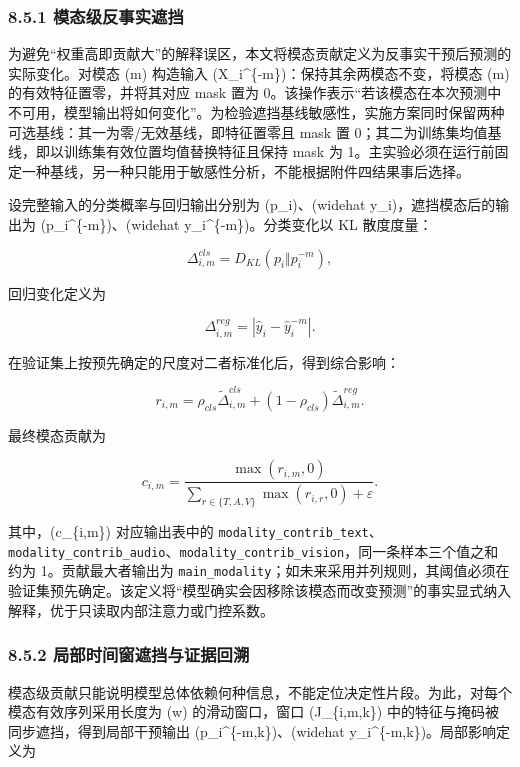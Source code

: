 \documentclass[
  12pt,
  a4paper,
]{ctexart}
\begin{document}
\hypertarget{ux6a21ux6001ux7ea7ux53cdux4e8bux5b9eux906eux6321}{%
\subsubsection{8.5.1
模态级反事实遮挡}\label{ux6a21ux6001ux7ea7ux53cdux4e8bux5b9eux906eux6321}}

为避免``权重高即贡献大''的解释误区，本文将模态贡献定义为反事实干预后预测的实际变化。对模态
(m) 构造输入 (X\_i\^{}\{-m\})：保持其余两模态不变，将模态 (m)
的有效特征置零，并将其对应 mask 置为
0。该操作表示``若该模态在本次预测中不可用，模型输出将如何变化''。为检验遮挡基线敏感性，实施方案同时保留两种可选基线：其一为零/无效基线，即特征置零且
mask 置 0；其二为训练集均值基线，即以训练集有效位置均值替换特征且保持
mask 为
1。主实验必须在运行前固定一种基线，另一种只能用于敏感性分析，不能根据附件四结果事后选择。

设完整输入的分类概率与回归输出分别为 (p\_i)、(widehat
y\_i)，遮挡模态后的输出为 (p\_i\^{}\{-m\})、(widehat
y\_i\^{}\{-m\})。分类变化以 KL 散度度量：

\[
\Delta_{i,m}^{cls}=D_{KL}(p_i\Vert p_i^{-m}),
\]

回归变化定义为

\[
\Delta_{i,m}^{reg}=|\widehat y_i-\widehat y_i^{-m}|.
\]

在验证集上按预先确定的尺度对二者标准化后，得到综合影响：

\[
r_{i,m}=\rho_{cls}\widetilde\Delta_{i,m}^{cls}
 +(1-\rho_{cls})\widetilde\Delta_{i,m}^{reg}.
\]

最终模态贡献为

\[
c_{i,m}=\frac{\max(r_{i,m},0)}
{\sum_{r\in\{T,A,V\}}\max(r_{i,r},0)+\varepsilon}.
\]

其中，(c\_\{i,m\}) 对应输出表中的
\texttt{modality\_contrib\_text}、\texttt{modality\_contrib\_audio}、\texttt{modality\_contrib\_vision}，同一条样本三个值之和约为
1。贡献最大者输出为
\texttt{main\_modality}；如未来采用并列规则，其阈值必须在验证集预先确定。该定义将``模型确实会因移除该模态而改变预测''的事实显式纳入解释，优于只读取内部注意力或门控系数。

\hypertarget{ux5c40ux90e8ux65f6ux95f4ux7a97ux906eux6321ux4e0eux8bc1ux636eux56deux6eaf}{%
\subsubsection{8.5.2
局部时间窗遮挡与证据回溯}\label{ux5c40ux90e8ux65f6ux95f4ux7a97ux906eux6321ux4e0eux8bc1ux636eux56deux6eaf}}

模态级贡献只能说明模型总体依赖何种信息，不能定位决定性片段。为此，对每个模态有效序列采用长度为
(w) 的滑动窗口，窗口 (J\_\{i,m,k\})
中的特征与掩码被同步遮挡，得到局部干预输出 (p\_i\^{}\{-m,k\})、(widehat
y\_i\^{}\{-m,k\})。局部影响定义为
\end{document}
